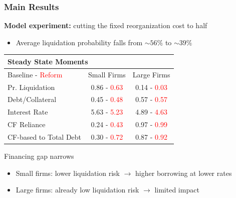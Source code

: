 \documentclass[aspectratio=169,xcolor=table]{beamer}
\begin{document}
\begin{frame}[label = Pexp]  \frametitle{Main Results}

\textbf{Model experiment:} cutting the fixed reorganization cost to half
\begin{itemize} \small
    \item Average liquidation probability falls from $\sim 56\%$ to $\sim 39\%$
\end{itemize} 

\small
\begin{table}[h!]
    \centering
    \renewcommand{\arraystretch}{0.85}
    \begin{tabular}{l|c|c}
    \multicolumn{3}{l}{\textbf{Steady State Moments}} \\ 
    \toprule
     Baseline - \textcolor{red}{Reform} & Small Firms & Large Firms \\
    \midrule
    Pr. Liquidation & 0.86 - \textcolor{red}{0.63} & 0.14 - \textcolor{red}{0.03} \\ 
    Debt/Collateral & 0.45 - \textcolor{red}{0.48} & 0.57 - \textcolor{red}{0.57} \\ 
    Interest Rate & 5.63 - \textcolor{red}{5.23} & 4.89 - \textcolor{red}{4.63} \\  
    CF Reliance & 0.24 - \textcolor{red}{0.43} & 0.97 - \textcolor{red}{0.99} \\ 
    CF-based to Total Debt & 0.30 - \textcolor{red}{0.72} & 0.87 - \textcolor{red}{0.92} \\ 
    \bottomrule
    \end{tabular}
    \label{tab:SSvalues_compact}
\end{table} \normalsize

Financing gap narrows
\begin{itemize} \small
    \item Small firms: lower liquidation risk $\rightarrow$ higher borrowing at lower rates
    \item Large firms: already low liquidation risk $\rightarrow$ limited impact
\end{itemize} 

\end{frame}
\end{document}
